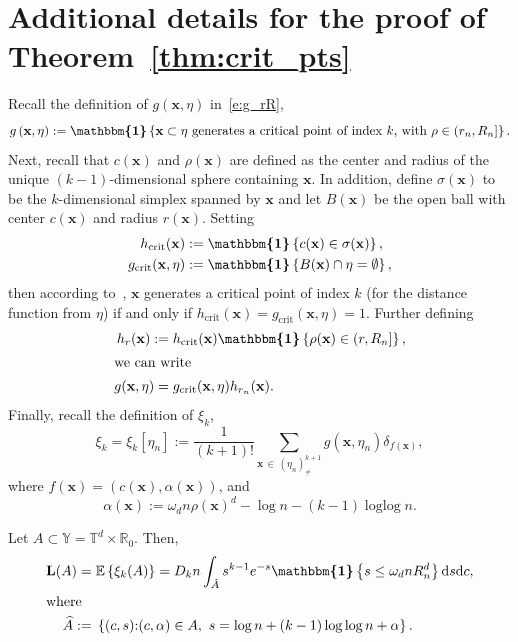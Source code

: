\documentclass[AHL,Unicode,longabstracts]{cedram}
\DeclareMathOperator{\logg}{\log\log}
\newcommand*\bL{\mathbf{L}}
\newcommand{\bx}{\mathbf{x}}
\newcommand*\R{\mathbb{R}}
\newcommand*\T{\mathbb{T}}
\newcommand*\Y{\mathbb{Y}}
\newcommand{\E}{\mathbb{E}}
\newcommand*\md{\mathrm{d}}
\newcommand{\mean}[1] {\E\left\{{#1}\right\}}
\newcommand{\ind}{\boldsymbol{\mathbbm{1}}}
\newcommand{\indf}[1]{\ind\set{#1}}
\newcommand{\set}[1]{\left\{#1\right\}}
\newcommand*\gcrit{g_{\mathrm{crit}}}
\newcommand*\hcrit{h_{\mathrm{crit}}}
\let\oldhat\hat
\renewcommand*{\hat}[1]{\mathchoice{\widehat{#1}}{\widehat{#1}}{\oldhat{#1}}{\oldhat{#1}}}
\begin{document}
\appendix

\section{Additional details for the proof of Theorem~\ref{thm:crit_pts}} 
Recall the definition of $g(\bx,\eta)$ in~\eqref{e:g_rR},
\[
g\left(\bx, \eta\right) := \ind\set{\bx\subset \eta \text{ generates a critical point of index $k$, with }\rho\in \left(r_n,R_n\right]}.
\]
Next, recall that $c(\bx)$ and $\rho(\bx)$ are defined as the center and radius of the unique $(k-1)$-dimensional sphere containing $\bx$. In addition, define $\sigma(\bx)$ to be the $k$-dimensional simplex spanned by $\bx$ and let $B(\bx)$ be the open ball with center $c(\bx)$ and radius $r(\bx)$. Setting
\begin{align*}
\hcrit(\bx) &:= \indf{c(\bx)\in \sigma(\bx)},\\
\gcrit(\bx,\eta) &:= \indf{B(\bx)\cap \eta = \emptyset},
\end{align*}
then according to~\cite[Lemma~2.4]{bobrowski2017}, $\bx$ generates a critical point of index $k$ (for the distance function from $\eta$) if and only if $\hcrit(\bx)=\gcrit(\bx,\eta)=1$. Further defining
\begin{align}
h_r(\bx) :=& \;\hcrit(\bx)\ind\set{\rho(\bx)\in \left(r,R_n\right]},\nonumber\\
\intertext{we can write}
g(\bx,\eta) =& \;\gcrit(\bx,\eta)h_{r_n}(\bx).\label{eqn:def_g}
\end{align}
Finally, recall the definition of $\xi_k$,
\[
\xi_k = \xi_k\left[\eta_n\right] := \frac{1}{(k+1)!} \sum_{\bx\,\in\,\left(\eta_n\right)^{k+1}_{\ne}} g\left(\bx,\eta_n\right) \delta_{f(\bx)},
\]
where $f(\bx) = (c(\bx),\alpha(\bx))$, and
\[
\alpha(\bx) := \omega_d n\rho(\bx)^d - \log n - (k-1)\logg n.
\]

\begin{lemm}\label{lem:L_A}
Let $A \subset \Y = \T^d\times\R_0$. Then,
\begin{align*}
\bL(A) =&\; \mean{\xi_k(A)} = D_k n \int_{\hat A} s^{k-1}e^{-s} \ind\set{s\le \omega_d n R_n^d } \md s \md c,\\
\intertext{where}
\hat A :=&\; \set{(c,s) {:} (c,\alpha)\in A,\ s = \log n + (k-1)\logg n + \alpha}.
\end{align*}
\end{lemm}
\end{document}
